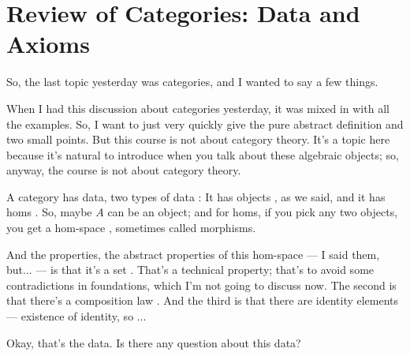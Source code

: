 \section{Review of Categories: Data and Axioms}

\begin{speech}[00:01:26 - 00:02:53]
So, the last topic yesterday was categories, and I wanted to say a few things.

When I had this discussion about categories yesterday, it was mixed in with all the examples. So, I want to just very quickly give the pure abstract definition and two small points. But this course is not about category theory. It's a topic here because it's natural to introduce when you talk about these algebraic objects; so, anyway, the course is not about category theory.

A category  has data, two types of data : It has objects , as we said, and it has homs . So, maybe $A$ can be an object; and for homs, if you pick any two objects, you get a hom-space , sometimes called morphisms.

And the properties, the abstract properties of this hom-space --- I said them, but... --- is that it's a set . That's a technical property; that's to avoid some contradictions in foundations, which I'm not going to discuss now. The second is that there's a composition law . And the third is that there are identity elements --- existence of identity, so ...

Okay, that's the data. Is there any question about this data?
\end{speech}

